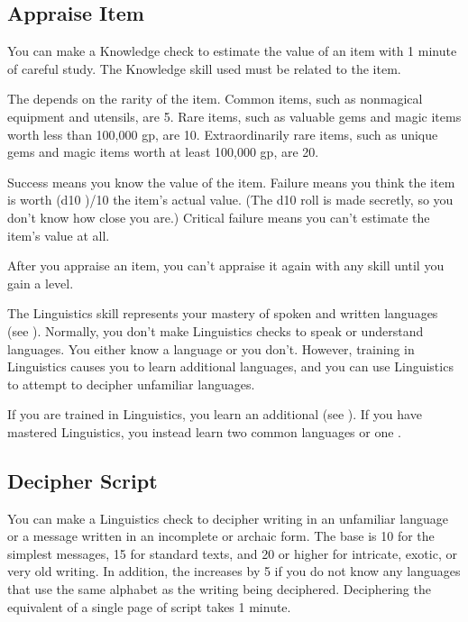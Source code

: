     \subsection{Appraise Item}
        You can make a Knowledge check to estimate the value of an item with 1 minute of careful study. The Knowledge skill used must be related to the item.

        The  depends on the rarity of the item. Common items, such as nonmagical equipment and utensils, are  5. Rare items, such as valuable gems and magic items worth less than 100,000 gp, are  10. Extraordinarily rare items, such as unique gems and magic items worth at least 100,000 gp, are  20.

        Success means you know the value of the item. Failure means you think the item is worth (d10 )/10 \x the item's actual value. (The d10 roll is made secretly, so you don't know how close you are.) Critical failure means you can't estimate the item's value at all.

        After you appraise an item, you can't appraise it again with any skill until you gain a level.

\newpage
{}
        The Linguistics skill represents your mastery of spoken and written languages (see ).
        Normally, you don't make Linguistics checks to speak or understand languages.
        You either know a language or you don't.
        However, training in Linguistics causes you to learn additional languages, and you can use Linguistics to attempt to decipher unfamiliar languages.

        If you are trained in Linguistics, you learn an additional  (see ).
        If you have mastered Linguistics, you instead learn two common languages or one .

    \subsection{Decipher Script}
        You can make a Linguistics check to decipher writing in an unfamiliar language or a message written in an incomplete or archaic form. The base  is 10 for the simplest messages, 15 for standard texts, and 20 or higher for intricate, exotic, or very old writing. In addition, the  increases by 5 if you do not know any languages that use the same alphabet as the writing being deciphered. Deciphering the equivalent of a single page of script takes 1 minute.

